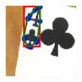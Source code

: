 \documentclass[a4paper]{article}
\begin{document}
\begin{minipage}{\columnwidth}
{\includegraphics[scale=1.27]{4c_4}}  
\qquad
{}  
\qquad
\subfloat[]{%
}
\end{minipage}
\end{document}
